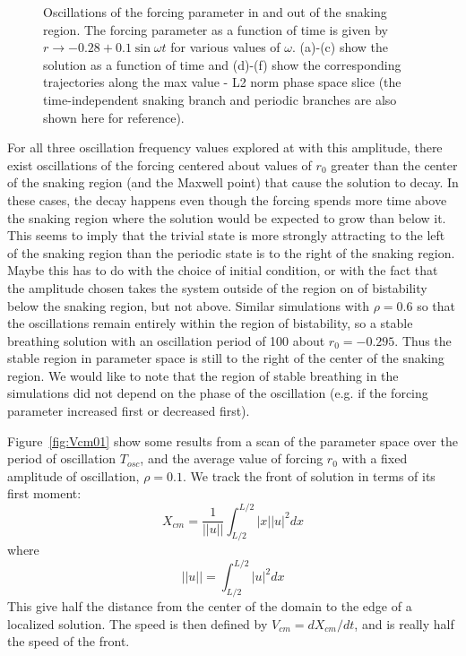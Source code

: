 \documentclass[pre,preprint,superscriptaddress]{revtex4-1}
\begin{document}
\begin{figure}[!htb]
\begin{center}
{}
    \caption{Oscillations of the forcing parameter in and out of the snaking region.  The forcing parameter as a function of time is given by $r\rightarrow -0.28+ 0.1\sin\omega t$ for various values of $\omega$. (a)-(c) show the solution as a function of time and (d)-(f) show the corresponding trajectories along the max value - L2 norm phase space slice (the time-independent snaking branch and periodic branches are also shown here for reference). }
    \label{fig:OscOutSnake}
  \end{center}
\end{figure}

For all three oscillation frequency values explored at with this amplitude, there exist oscillations of the forcing centered about values of $r_0$ greater than the center of the snaking region (and the Maxwell point) that cause the solution to decay.  In these cases, the decay happens even though the forcing spends more time above the snaking region where the solution would be expected to grow than below it.  This seems to imply that the trivial state is more strongly attracting to the left of the snaking region than the periodic state is to the right of the snaking region.  Maybe this has to do with the choice of initial condition, or with the fact that the amplitude chosen takes the system outside of the region on of bistability below the snaking region, but not above.  Similar simulations with $\rho=0.6$ so that the oscillations remain entirely within the region of bistability, so a stable breathing solution with an oscillation period of 100 about $r_0=-0.295$.  Thus the stable region in parameter space is still to the right of the center of the snaking region.   We would like to note that the region of stable breathing in the simulations did not depend on the phase of the oscillation (e.g. if the forcing parameter increased first or decreased first). 

Figure~\ref{fig:Vcm01} show some results from a scan of the parameter space over the period of oscillation $T_{osc}$, and the average value of forcing $r_0$ with a fixed amplitude of oscillation, $\rho =0.1$.  We track the front of solution in terms of its first moment:
\begin{equation}
X_{cm}=\frac{1}{||u||} \int_{L/2}^{L/2}  |x| |u|^2 dx
\end{equation}
where 
\begin{equation}
||u||= \int_{L/2}^{L/2}  |u|^2 dx
\end{equation}
This give half the distance from the center of the domain to the edge of a localized solution. The speed is then defined by $V_{cm} = d X_{cm}/dt$, and is really half the speed of the front.
\end{document}
